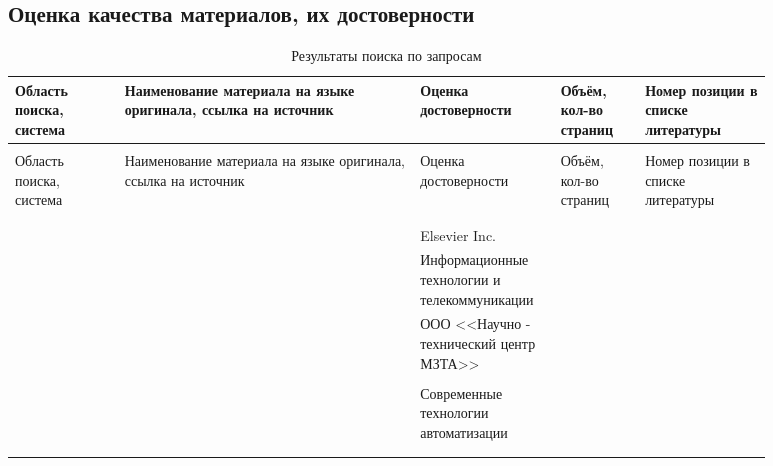 \subsection{Оценка качества материалов, их достоверности}
\begin{center}
	\begin{longtable}{|C{0.13\linewidth}|C{0.35\linewidth}|C{0.15\linewidth}|C{0.1\linewidth}|C{0.15\linewidth}|}
		\caption{Результаты поиска по запросам}
		\label{tab:search_results}\\
		\hline
		\bfseries  Область поиска, система &\bfseries Наименование материала на языке оригинала, ссылка на источник & \bfseries Оценка достоверности & \bfseries Объём, кол-во страниц & \bfseries Номер позиции в списке литературы\\
		\endfirsthead
		\cpt\\
		\hline
		  Область поиска, система & Наименование материала на языке оригинала, ссылка на источник &  Оценка достоверности &  Объём, кол-во страниц &  Номер позиции в списке литературы\\
		\endhead
		\hline
		\gs &&&&\cite{hussein_wheeb_performance_2015}\\
		\hline
		\gs &&&&\cite{kumar_survey_2012}\\
		\hline
		\gs &&Elsevier Inc.&&\cite{noergaard_chapter_2010}\\
		\hline
		\gs &&Информа\-ционные технологии и телекоммуникации&&\cite{__2017-1}\\
		\hline
		\gs &&ООО <<Научно - техничес\-кий центр МЗТА>>&&\cite{__2016}\\
		\hline
		\gs &&&&\cite{__2001}\\
		\hline
		\gs &&Современ\-ные технологии автоматизации&&\cite{__2002}\\
		\hline
		\gs &&&&\cite{__2018-1}\\
		\hline
		\gs &&&&\cite{powell_profibus_2013}\\

\end{longtable}
\end{center}
